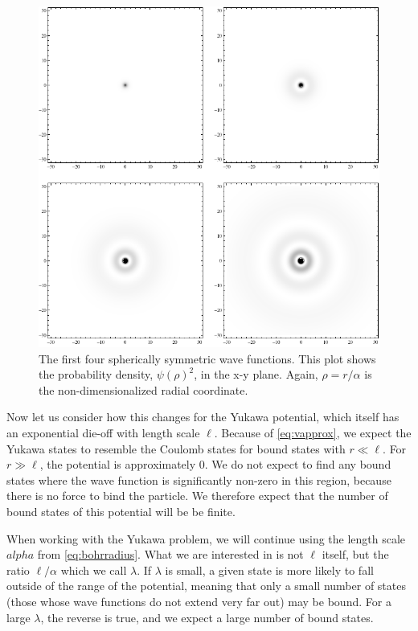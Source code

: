 \documentclass[12pt,twoside]{reedthesis}
\begin{document}
\begin{figure}[h]
\centering
\includegraphics[scale=0.55]{Figures/densityplots}
\caption[Density plots of the first four spherically symmetric Coulomb wave functions]{The first four spherically symmetric wave functions. This plot shows the probability density, $\psi(\rho)^2$, in the x-y plane. Again, $\rho = r/\alpha$ is the non-dimensionalized radial coordinate.}
\label{fig:boundstates}
\end{figure}

Now let us consider how this changes for the Yukawa potential, which itself has an exponential die-off with length scale $\ell$. Because of \eqref{eq:vapprox}, we expect the Yukawa states to resemble the Coulomb states for bound states with $r \ll \ell$. For $r \gg \ell$, the potential is approximately $0$. We do not expect to find any bound states where the wave function is significantly non-zero in this region, because there is no force to bind the particle. We therefore expect that the number of bound states of this potential will be be finite.

When working with the Yukawa problem, we will continue using the length scale $alpha$ from \eqref{eq:bohrradius}. What we are interested in is not $\ell$ itself, but the ratio $\ell / \alpha$ which we call $\lambda$.
If $\lambda$ is small, a given state is more likely to fall outside of the range of the potential, meaning that only a small number of states (those whose wave functions do not extend very far out) may be bound. For a large $\lambda$, the reverse is true, and we expect a large number of bound states.
\end{document}

